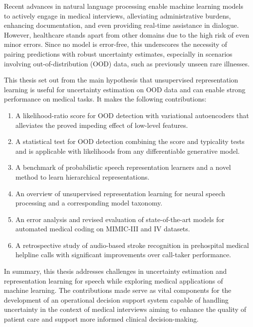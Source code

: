 Recent advances in natural language processing enable machine learning models to actively engage in medical interviews, alleviating administrative burdens, enhancing documentation, and even providing real-time assistance in dialogue.
However, healthcare stands apart from other domains due to the high risk of even minor errors. Since no model is error-free, this underscores the necessity of pairing predictions with robust uncertainty estimates, especially in scenarios involving out-of-distribution (OOD) data, such as previously unseen rare illnesses. 

This thesis set out from the main hypothesis that unsupervised representation learning is useful for uncertainty estimation on OOD data and can enable strong performance on medical tasks. 
It makes the following contributions:
%
\begin{enumerate}[topsep=3pt, partopsep=0pt, itemsep=3pt, parsep=0pt, leftmargin=2em, label=(\alph*)] %
    \item A likelihood-ratio score for OOD detection with variational autoencoders that alleviates the proved impeding effect of low-level features.
    \item A statistical test for OOD detection combining the score and typicality tests and is applicable with likelihoods from any differentiable generative model.
    \item A benchmark of probabilistic speech representation learners and a novel method to learn hierarchical representations.
    \item An overview of unsupervised representation learning for neural speech processing and a corresponding model taxonomy.
    \item An error analysis and revised evaluation of state-of-the-art models for automated medical coding on MIMIC-III and IV datasets. 
    \item A retrospective study of audio-based stroke recognition in prehospital medical helpline calls with significant improvements over call-taker performance.
\end{enumerate}
%
In summary, this thesis addresses challenges in uncertainty estimation and representation learning for speech while exploring medical applications of machine learning.
The contributions made serve as vital components for the development of an operational decision support system capable of handling uncertainty in the context of medical interviews aiming to enhance the quality of patient care and support more informed clinical decision-making.



